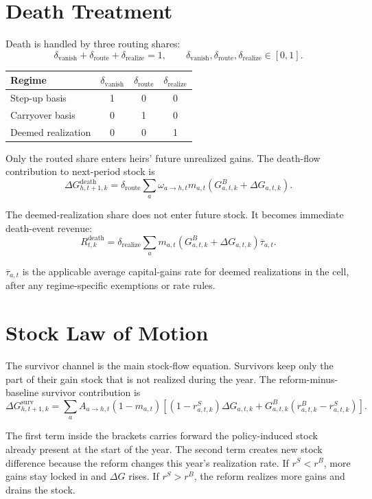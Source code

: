 \documentclass[11pt]{article}
\newcommand{\GB}{G^B}
\newcommand{\dG}{\Delta G}
\newcommand{\dd}{\delta}
\begin{document}
\section{Death Treatment}

Death is handled by three routing shares:
\[
\dd_{\mathrm{vanish}}+\dd_{\mathrm{route}}+\dd_{\mathrm{realize}}=1,
\qquad
\dd_{\mathrm{vanish}},\dd_{\mathrm{route}},\dd_{\mathrm{realize}}\in[0,1].
\]

\begin{center}
\begin{tabular}{lccc}
\toprule
Regime & $\dd_{\mathrm{vanish}}$ & $\dd_{\mathrm{route}}$ & $\dd_{\mathrm{realize}}$ \\
\midrule
Step-up basis & 1 & 0 & 0 \\
Carryover basis & 0 & 1 & 0 \\
Deemed realization & 0 & 0 & 1 \\
\bottomrule
\end{tabular}
\end{center}

Only the routed share enters heirs' future unrealized gains. The death-flow
contribution to next-period stock is
\[
\boxed{
\dG^{\mathrm{death}}_{h,t+1,k}
=
\dd_{\mathrm{route}}
\sum_a
\omega_{a \to h,t}m_{a,t}
\left(\GB_{a,t,k}+\dG_{a,t,k}\right).
}
\]

The deemed-realization share does not enter future stock. It becomes immediate
death-event revenue:
\[
\boxed{
R^{\mathrm{death}}_{t,k}
=
\dd_{\mathrm{realize}}
\sum_a
m_{a,t}
\left(\GB_{a,t,k}+\dG_{a,t,k}\right)
\overline{\tau}_{a,t}.
}
\]

$\overline{\tau}_{a,t}$ is the applicable average capital-gains rate for
deemed realizations in the cell, after any regime-specific exemptions or rate
rules.

\section{Stock Law of Motion}

The survivor channel is the main stock-flow equation. Survivors keep only the
part of their gain stock that is not realized during the year. The
reform-minus-baseline survivor contribution is
\[
\boxed{
\dG^{\mathrm{surv}}_{h,t+1,k}
=
\sum_a A_{a \to h,t}(1-m_{a,t})
\left[
(1-r^S_{a,t,k})\dG_{a,t,k}
+
\GB_{a,t,k}(r^B_{a,t,k}-r^S_{a,t,k})
\right].
}
\]

The first term inside the brackets carries forward the policy-induced stock
already present at the start of the year. The second term creates new stock
difference because the reform changes this year's realization rate. If
$r^S<r^B$, more gains stay locked in and $\dG$ rises. If $r^S>r^B$, the
reform realizes more gains and drains the stock.
\end{document}
